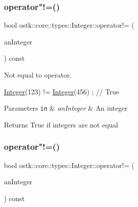\mbox{\label{classostk_1_1core_1_1types_1_1_integer_acd24f2214c622eb2988167d26da9f387}} 
\subsubsection{\texorpdfstring{operator"!=()}{operator!=()}\hspace{0.1cm}{\footnotesize\ttfamily [1/2]}}
{\footnotesize\ttfamily bool ostk\+::core\+::types\+::\+Integer\+::operator!= (\begin{DoxyParamCaption}\item[{const \hyperlink{classostk_1_1core_1_1types_1_1_integer}{Integer} \&}]{an\+Integer }\end{DoxyParamCaption}) const}



Not equal to operator. 


\begin{DoxyCode}
\hyperlink{classostk_1_1core_1_1types_1_1_integer_a209b939281106d4b590ad98fae291af9}{Integer}(123) != \hyperlink{classostk_1_1core_1_1types_1_1_integer_a209b939281106d4b590ad98fae291af9}{Integer}(456) ; \textcolor{comment}{// True}
\end{DoxyCode}



\begin{DoxyParams}[1]{Parameters}
\mbox{\tt in}  & {\em an\+Integer} & An integer \\
\hline
\end{DoxyParams}
\begin{DoxyReturn}{Returns}
True if integers are not equal 
\end{DoxyReturn}
\mbox{\label{classostk_1_1core_1_1types_1_1_integer_aac060d7013e5a65be3ad78c02d73ef48}} 
\subsubsection{\texorpdfstring{operator"!=()}{operator!=()}\hspace{0.1cm}{\footnotesize\ttfamily [2/2]}}
{\footnotesize\ttfamily bool ostk\+::core\+::types\+::\+Integer\+::operator!= (\begin{DoxyParamCaption}\item[{const \hyperlink{classostk_1_1core_1_1types_1_1_integer_a76a5f41f78659f116eafaf26cecc3244}{Integer\+::\+Value\+Type} \&}]{an\+Integer }\end{DoxyParamCaption}) const}

